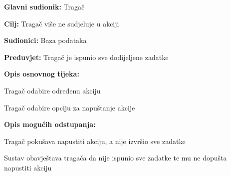 					
					
					\noindent {}
					\begin{packed_item}
						
						\item \textbf{Glavni sudionik: }Tragač
						\item  \textbf{Cilj:} Tragač više ne sudjeluje u akciji
						\item  \textbf{Sudionici:} Baza podataka
						\item  \textbf{Preduvjet:} Tragač je ispunio sve dodijeljene zadatke
						\item  \textbf{Opis osnovnog tijeka:}
						
						\item[] \begin{packed_enum}
							
							\item Tragač odabire određenu akciju
							\item Tragač odabire opciju za napuštanje akcije
	
						\end{packed_enum}
						
						\item  \textbf{Opis mogućih odstupanja:}
						
						\item[] \begin{packed_item}
							
							\item[1.a] Tragač pokušava napustiti akciju, a nije izvršio sve zadatke
							\item[] \begin{packed_enum}
								
								\item Sustav obavještava tragača da nije ispunio sve zadatke te mu ne dopušta napustiti akciju
								
							\end{packed_enum}
							
						\end{packed_item}
						
					\end{packed_item}
					
